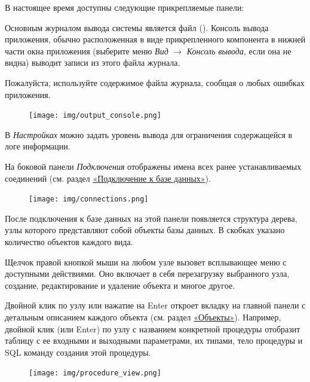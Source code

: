 В настоящее время доступны следующие прикрепляемые панели:


Основным журналом вывода системы является файл  (). Консоль вывода приложения, обычно расположенная в виде прикрепленного компонента в нижней части окна приложения (выберите меню \textit{Вид} $\rightarrow$ \textit{Консоль вывода}, если она не видна) выводит записи из этого файла журнала.

\begin{redremark}
Пожалуйста, используйте содержимое файла журнала, сообщая о любых ошибках приложения.
\end{redremark}

\begin{figure}[H]
	\centering
	\texttt{[image: img/output\_console.png]}
\end{figure}

 В \textit{Настройках} можно задать уровень вывода для ограничения содержащейся в логе информации.


На боковой панели \textit{Подключения} отображены имена всех ранее устанавливаемых соединений (см. раздел \hyperref[sec:connections]{«Подключение к базе данных»}). 

\begin{figure}[H]
	\centering
	\texttt{[image: img/connections.png]}
\end{figure}

После подключения к базе данных на этой панели появляется структура дерева, узлы которого представляют собой объекты базы данных. В скобках указано количество объектов каждого вида.

Щелчок правой кнопкой мыши на любом узле вызовет всплывающее меню с доступными действиями. Оно включает в себя перезагрузку выбранного узла, создание, редактирование и удаление объекта и многое другое.

Двойной клик по узлу или нажатие на Enter  откроет вкладку на главной панели с детальным описанием каждого объекта (см. раздел \hyperref[sec:objects]{«Объекты»}). Например, двойной клик (или Enter) по узлу с названием конкретной процедуры отобразит таблицу с ее входными и выходными параметрами, их типами, тело процедуры и SQL команду создания этой процедуры.

\begin{figure}[H]
	\centering
	\texttt{[image: img/procedure\_view.png]}
\end{figure}

